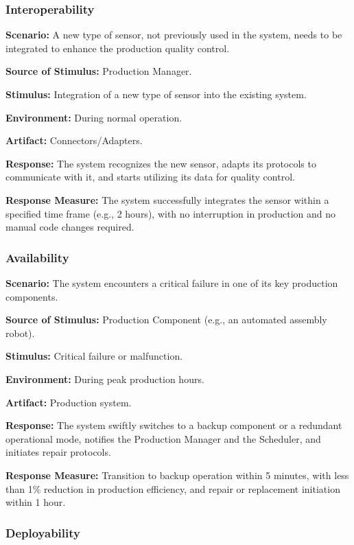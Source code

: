 \documentclass[conference]{IEEEtran}
\begin{document}
\subsubsection*{Interoperability}

\textbf{Scenario:} A new type of sensor, not previously used in the system, needs to be integrated to enhance the production quality control.

\textbf{Source of Stimulus:} Production Manager.

\textbf{Stimulus:} Integration of a new type of sensor into the existing system.

\textbf{Environment:} During normal operation.

\textbf{Artifact:} Connectors/Adapters.

\textbf{Response:} The system recognizes the new sensor, adapts its protocols to communicate with it, and starts utilizing its data for quality control.

\textbf{Response Measure:} The system successfully integrates the sensor within a specified time frame (e.g., 2 hours), with no interruption in production and no manual code changes required.

\subsubsection*{Availability}

\textbf{Scenario:} The system encounters a critical failure in one of its key production components.

\textbf{Source of Stimulus:} Production Component (e.g., an automated assembly robot).

\textbf{Stimulus:} Critical failure or malfunction.

\textbf{Environment:} During peak production hours.

\textbf{Artifact:} Production system.

\textbf{Response:} The system swiftly switches to a backup component or a redundant operational mode, notifies the Production Manager and the Scheduler, and initiates repair protocols.

\textbf{Response Measure:} Transition to backup operation within 5 minutes, with less than 1\% reduction in production efficiency, and repair or replacement initiation within 1 hour.

\subsubsection*{Deployability}
\end{document}
